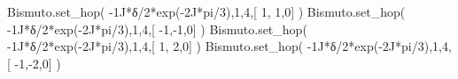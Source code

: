 \documentclass[
  letterpaper,
  DIV=11,
  numbers=noendperiod]{scrreprt}
\newenvironment{Shaded}{\begin{snugshade}}{\end{snugshade}}
\newcommand{\DecValTok}[1]{\textcolor[rgb]{0.68,0.00,0.00}{#1}}
\newcommand{\NormalTok}[1]{\textcolor[rgb]{0.00,0.23,0.31}{#1}}
\newcommand{\OperatorTok}[1]{\textcolor[rgb]{0.37,0.37,0.37}{#1}}
\newcommand{\OtherTok}[1]{\textcolor[rgb]{0.00,0.23,0.31}{#1}}
\begin{document}
\begin{Shaded}
\begin{Highlighting}[]
\NormalTok{Bismuto.set\_hop( }\OperatorTok{{-}}\OtherTok{1J}\OperatorTok{*}\NormalTok{δ}\OperatorTok{/}\DecValTok{2}\OperatorTok{*}\NormalTok{exp(}\OperatorTok{{-}}\OtherTok{2J}\OperatorTok{*}\NormalTok{pi}\OperatorTok{/}\DecValTok{3}\NormalTok{),}\DecValTok{1}\NormalTok{,}\DecValTok{4}\NormalTok{,[  }\DecValTok{1}\NormalTok{, }\DecValTok{1}\NormalTok{,}\DecValTok{0}\NormalTok{] ) }
\NormalTok{Bismuto.set\_hop( }\OperatorTok{{-}}\OtherTok{1J}\OperatorTok{*}\NormalTok{δ}\OperatorTok{/}\DecValTok{2}\OperatorTok{*}\NormalTok{exp(}\OperatorTok{{-}}\OtherTok{2J}\OperatorTok{*}\NormalTok{pi}\OperatorTok{/}\DecValTok{3}\NormalTok{),}\DecValTok{1}\NormalTok{,}\DecValTok{4}\NormalTok{,[ }\OperatorTok{{-}}\DecValTok{1}\NormalTok{,}\OperatorTok{{-}}\DecValTok{1}\NormalTok{,}\DecValTok{0}\NormalTok{] )}
\NormalTok{Bismuto.set\_hop( }\OperatorTok{{-}}\OtherTok{1J}\OperatorTok{*}\NormalTok{δ}\OperatorTok{/}\DecValTok{2}\OperatorTok{*}\NormalTok{exp(}\OperatorTok{{-}}\OtherTok{2J}\OperatorTok{*}\NormalTok{pi}\OperatorTok{/}\DecValTok{3}\NormalTok{),}\DecValTok{1}\NormalTok{,}\DecValTok{4}\NormalTok{,[  }\DecValTok{1}\NormalTok{, }\DecValTok{2}\NormalTok{,}\DecValTok{0}\NormalTok{] )  }
\NormalTok{Bismuto.set\_hop( }\OperatorTok{{-}}\OtherTok{1J}\OperatorTok{*}\NormalTok{δ}\OperatorTok{/}\DecValTok{2}\OperatorTok{*}\NormalTok{exp(}\OperatorTok{{-}}\OtherTok{2J}\OperatorTok{*}\NormalTok{pi}\OperatorTok{/}\DecValTok{3}\NormalTok{),}\DecValTok{1}\NormalTok{,}\DecValTok{4}\NormalTok{,[ }\OperatorTok{{-}}\DecValTok{1}\NormalTok{,}\OperatorTok{{-}}\DecValTok{2}\NormalTok{,}\DecValTok{0}\NormalTok{] ) }
\end{Highlighting}
\end{Shaded}
\end{document}
